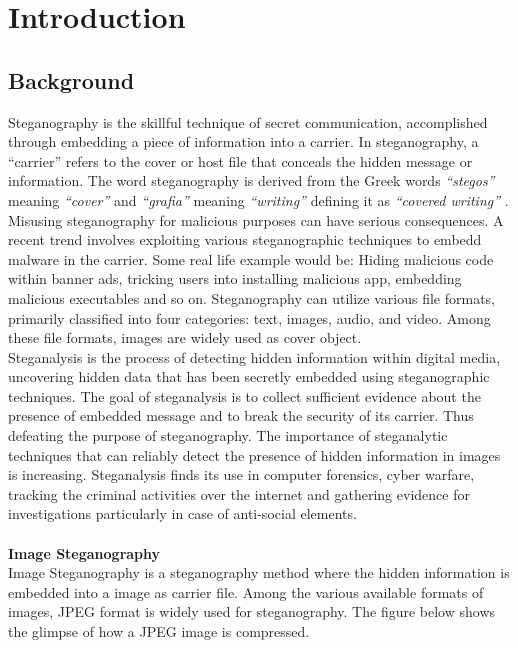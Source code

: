\chapter{Introduction}
\section{Background}  
\sloppy
Steganography is the skillful technique of secret communication, accomplished through embedding a piece of information into a carrier. In steganography, a ``carrier'' refers to the cover or host file that conceals the hidden message or information. The word steganography is derived from the Greek words \textit{“stegos”} meaning \textit{“cover”} and \textit{“grafia”} meaning \textit{“writing”} defining it as \textit{“covered writing”} \cite{14}. Misusing steganography for malicious purposes can have serious consequences. A recent trend involves exploiting various steganographic techniques to embedd malware in the carrier. Some real life example would be: Hiding malicious code within banner ads, tricking users into installing malicious app, embedding malicious executables and so on. Steganography can utilize various file formats, primarily classified into four categories: text, images, audio, and video. Among these file formats, images are widely used as cover object.\\
Steganalysis is the process of detecting hidden information within digital media, uncovering hidden data that has been secretly embedded using steganographic techniques. The goal of steganalysis is to collect sufficient evidence about the presence of embedded message and to break the security of its carrier. Thus defeating the purpose of steganography. The importance of steganalytic techniques that can reliably detect the presence of hidden information in images is increasing. Steganalysis finds its use in computer forensics, cyber warfare, tracking the criminal activities over the internet and gathering evidence for investigations particularly in case of anti-social elements.\cite{20} \\ \\
\textbf{Image Steganography}\\
Image Steganography is a steganography method where the hidden information is embedded into a image as carrier file. Among the various available formats of images, JPEG format is widely used for steganography. The figure below shows the glimpse of how a JPEG image is compressed.\\
